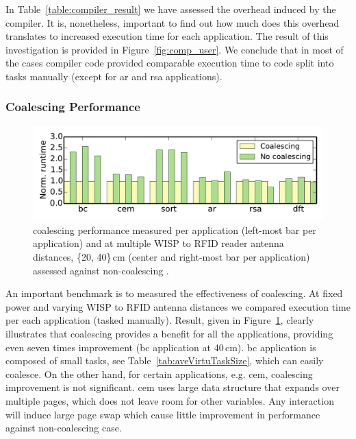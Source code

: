 In Table~\ref{table:compiler_result} we have assessed the overhead induced by the \sys compiler. It is, nonetheless, important to find out how much does this overhead translates to increased execution time for each \sys application. The result of this investigation is provided in Figure~\ref{fig:comp_user}. We conclude that in most of the cases \sys compiler code provided comparable execution time to code split into tasks manually (except for ar and rsa applications). 

\subsubsection{\sys Coalescing Performance}
\label{sec:result_compiler_time}

\begin{figure}
	\centering
	\includegraphics[width=\columnwidth]{figures/coalescing}
	\caption{\sys coalescing performance measured per application (left-most bar per application) and at multiple WISP to RFID reader antenna distances, \{20, 40\}\,cm (center and right-most bar per application) assessed against non-coalescing \sys.}
	\label{fig:coalescing}
\end{figure}

An important benchmark is to measured the effectiveness of \sys coalescing. At fixed power and varying WISP to RFID antenna distances we compared \sys execution time per each application (tasked manually). Result, given in Figure~\ref{fig:coalescing}, clearly illustrates that coalescing provides a benefit for all the applications, providing even seven times improvement (bc application at 40\,cm). bc application is composed of small tasks, see Table~\ref{tab:aveVirtuTaskSize}, which \sys can easily coalesce. On the other hand, for certain applications, e.g. cem, coalescing improvement is not significant. cem uses large data structure that expands over multiple pages, which does not leave room for other variables. Any interaction will induce large page swap which cause little improvement in \sys performance against non-coalescing case. 

